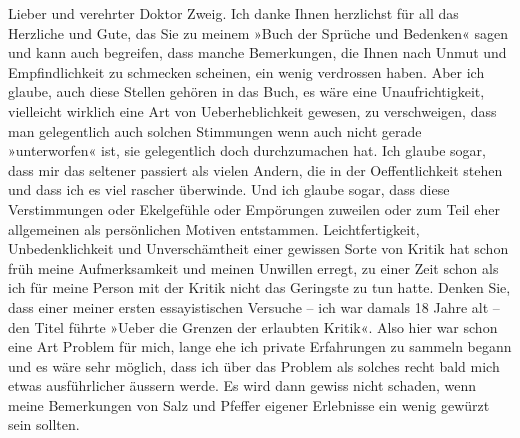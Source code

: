 \pstart{}Lieber und verehrter Doktor Zweig.\pend\vspace{0.5em}
\pstart
           Ich danke Ihnen herzlichst für all das Herzliche und Gute, das Sie zu meinem »Buch der Sprüche und Bedenken« sagen und kann
               auch begreifen, dass manche Bemerkungen, die Ihnen nach Unmut und Empfindlichkeit zu
               schmecken scheinen, ein wenig verdrossen haben. Aber ich glaube, auch diese Stellen
               gehören in das Buch, es wäre
               eine Unaufrichtigkeit, vielleicht wirklich eine Art von Ueberheblichkeit gewesen, zu
               verschweigen, dass man gelegentlich auch solchen Stimmungen wenn auch nicht gerade
               »unterworfen« ist, sie gelegentlich doch durchzumachen hat. Ich glaube sogar, dass
               mir das seltener passiert als vielen Andern, die in der Oeffentlichkeit stehen und
               dass ich es viel rascher überwinde. Und ich glaube sogar, dass diese Verstimmungen
               oder Ekelgefühle oder Empörungen zuweilen oder zum Teil eher allgemeinen als
               persönlichen Motiven entstammen. Leichtfertigkeit, Unbedenklichkeit und
               Unverschämtheit einer gewissen Sorte von Kritik hat schon früh meine Aufmerksamkeit
               und meinen Unwillen erregt, zu einer Zeit schon als ich für meine Person mit der
               Kritik nicht das Geringste zu tun hatte. Denken Sie, dass einer meiner ersten
               essayistischen Versuche – ich war damals 18 Jahre alt – den Titel führte »Ueber die Grenzen der erlaubten Kritik«. Also
               hier war schon eine Art Problem für mich, lange ehe ich private Erfahrungen zu
               sammeln begann und es wäre sehr möglich, dass ich über das Problem als solches recht
               bald mich etwas ausführlicher äussern werde. Es wird dann gewiss nicht schaden, wenn
               meine Bemerkungen von Salz und Pfeffer eigener Erlebnisse ein wenig gewürzt sein
               sollten.\pend
           
